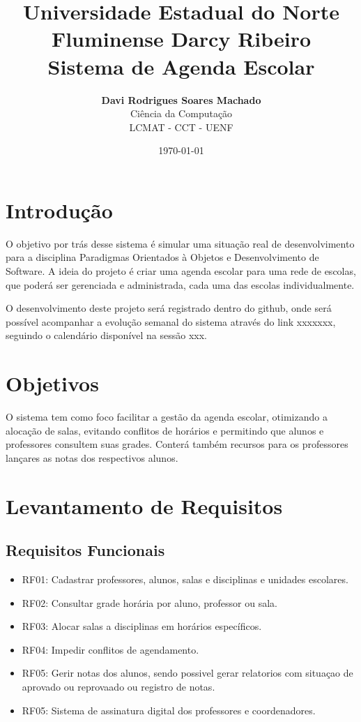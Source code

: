 \documentclass[12pt,a4paper]{report}
\title{
    \vspace{2cm}
    \Huge \textbf{Universidade Estadual do Norte Fluminense Darcy Ribeiro} \\[0.5cm]
    \Large Sistema de Agenda Escolar
    \vspace{2cm}
}
\author{\textbf{Davi Rodrigues Soares Machado} \\ Ciência da Computação \\ LCMAT - CCT - UENF}
\date{\today}
\begin{document}
\maketitle
\newpage

\tableofcontents
\newpage

\chapter{Introdução}
O objetivo por trás desse sistema é simular uma situação real de desenvolvimento para a disciplina Paradigmas Orientados à Objetos e Desenvolvimento de Software. A ideia do projeto é criar uma agenda escolar para uma rede de escolas, que poderá ser gerenciada e administrada, cada uma das escolas individualmente.

O desenvolvimento deste projeto será registrado dentro do github, onde será possível acompanhar a evolução semanal do sistema através do link xxxxxxx, seguindo o calendário disponível na sessão xxx. 


\chapter{Objetivos}
O sistema tem como foco facilitar a gestão da agenda escolar, otimizando a alocação de salas, evitando conflitos de horários e permitindo que alunos e professores consultem suas grades. Conterá também recursos para os professores lançares as notas dos respectivos alunos. 

\chapter{Levantamento de Requisitos}
\section{Requisitos Funcionais}
\begin{itemize}
    \item RF01: Cadastrar professores, alunos, salas e disciplinas e unidades escolares.
    \item RF02: Consultar grade horária por aluno, professor ou sala.
    \item RF03: Alocar salas a disciplinas em horários específicos.
    \item RF04: Impedir conflitos de agendamento.
    \item RF05: Gerir notas dos alunos, sendo possivel gerar relatorios com situaçao de aprovado ou reprovaado ou registro de notas.
    \item RF05: Sistema de assinatura digital dos professores e coordenadores.
\end{itemize}
\end{document}
